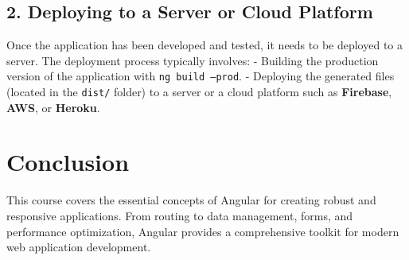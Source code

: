 \documentclass{article}
\begin{document}
\subsection*{2. Deploying to a Server or Cloud Platform}

Once the application has been developed and tested, it needs to be deployed to a server. The deployment process typically involves:
- Building the production version of the application with \texttt{ng build --prod}.
- Deploying the generated files (located in the \texttt{dist/} folder) to a server or a cloud platform such as \textbf{Firebase}, \textbf{AWS}, or \textbf{Heroku}.

\section*{Conclusion}

This course covers the essential concepts of Angular for creating robust and responsive applications. From routing to data management, forms, and performance optimization, Angular provides a comprehensive toolkit for modern web application development.
\end{document}
